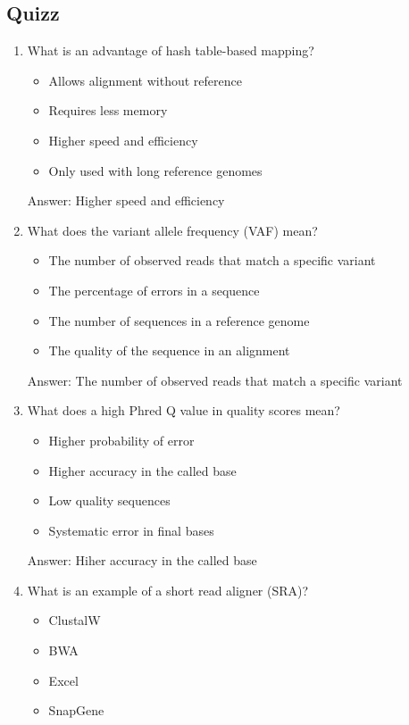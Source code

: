 \subsection{Quizz}
\begin{enumerate}
\item What is an advantage of hash table-based mapping?
\begin{itemize}
\item Allows alignment without reference
\item Requires less memory
\item Higher speed and efficiency
\item Only used with long reference genomes
\end{itemize}

Answer: Higher speed and efficiency

\item What does the variant allele frequency (VAF) mean?
\begin{itemize}
\item The number of observed reads that match a specific variant
\item The percentage of errors in a sequence
\item The number of sequences in a reference genome
\item The quality of the sequence in an alignment
\end{itemize}

Answer: The number of observed reads that match a specific variant

\item What does a high Phred Q value in quality scores mean?
\begin{itemize}
\item Higher probability of error
\item Higher accuracy in the called base
\item Low quality sequences
\item Systematic error in final bases
\end{itemize}

Answer: Hiher accuracy in the called base

\item What is an example of a short read aligner (SRA)?
\begin{itemize}
\item ClustalW
\item BWA
\item Excel
\item SnapGene
\end{itemize}


\end{enumerate}
